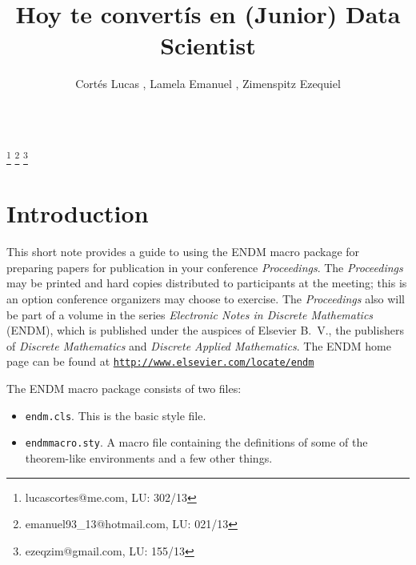 \documentclass{endm}
\begin{document}
\begin{verbatim}\end{verbatim}\vspace{2.5cm}

\begin{frontmatter}

\title{Hoy te convert\'is en (Junior) Data Scientist}

\author{Cort\'es Lucas , Lamela Emanuel , Zimenspitz Ezequiel }
\address{Universidad de Buenos Aires\\ Buenos Aires, Argentina}

\thanks[lucasemail]{lucascortes@me.com, LU: 302/13}
\thanks[emanuelemail]{emanuel93\_13@hotmail.com, LU: 021/13}
\thanks[ezequielemail]{ezeqzim@gmail.com, LU: 155/13}

\begin{abstract}
\end{abstract}

\begin{keyword}
\end{keyword}

\end{frontmatter}


\section{Introduction}\label{intro}

This short note provides a guide to using the ENDM macro package for
preparing papers for publication in your conference \emph{Proceedings}.
The \emph{Proceedings} may be printed and hard copies distributed to
participants at the meeting; this is an option conference organizers
may choose to exercise.  The \emph{Proceedings} also will be part of
a volume in the series \emph{Electronic Notes in Discrete Mathematics}
(ENDM), which is published under the auspices of Elsevier B.~V., the
publishers of \emph{Discrete Mathematics} and \emph{Discrete Applied
Mathematics}. The ENDM home page can be found at
\href{http://www.elsevier.com/locate/endm}
{\texttt{http://www.elsevier.com/locate/endm}}

The ENDM macro package consists of two files:
\begin{itemize}
\item \texttt{endm.cls}. This is the basic style file.
\item \texttt{endmmacro.sty}. A macro file containing the definitions
of some of the theorem-like environments and a few other things.
\end{itemize}
\end{document}
